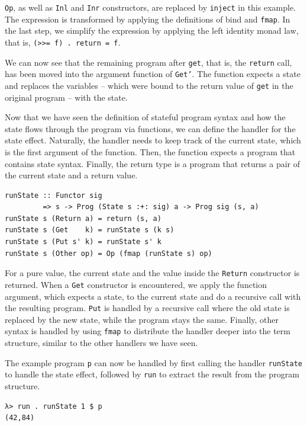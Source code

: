 \documentclass[a4paper, 11pt, fleqn, twoside]{scrreprt}
\newcommand{\hinl}[1]{\texttt{#1}}
\begin{document}
\hinl{Op}, as well as \hinl{Inl} and \hinl{Inr} constructors, are replaced by \hinl{inject} in this example.
The expression is transformed by applying the definitions of bind and \hinl{fmap}.
In the last step, we simplify the expression by applying the left identity monad law, that is, \hinl{(>>= f) . return = f}.

We can now see that the remaining program after \hinl{get}, that is, the \hinl{return} call, has been moved into the argument function of \hinl{Get'}.
The function expects a state and replaces the variables -- which were bound to the return value of \hinl{get} in the original program -- with the state.

Now that we have seen the definition of stateful program syntax and how the state flows through the program via functions, we can define the handler for the state effect.
Naturally, the handler needs to keep track of the current state, which is the first argument of the function.
Then, the function expects a program that contains state syntax.
Finally, the return type is a program that returns a pair of the current state and a return value.

\begin{verbatim}
runState :: Functor sig 
         => s -> Prog (State s :+: sig) a -> Prog sig (s, a)
runState s (Return a) = return (s, a)
runState s (Get    k) = runState s (k s)
runState s (Put s' k) = runState s' k
runState s (Other op) = Op (fmap (runState s) op)
\end{verbatim}

For a pure value, the current state and the value inside the \hinl{Return} constructor is returned.
When a \hinl{Get} constructor is encountered, we apply the function argument, which expects a state, to the current state and do a recursive call with the resulting program.
\hinl{Put} is handled by a recursive call where the old state is replaced by the new state, while the program stays the same.
Finally, other syntax is handled by using \hinl{fmap} to distribute the handler deeper into the term structure, similar to the other handlers we have seen.

The example program \hinl{p} can now be handled by first calling the handler \hinl{runState} to handle the state effect, followed by \hinl{run} to extract the result from the program structure.

\begin{verbatim}
λ> run . runState 1 $ p
(42,84)
\end{verbatim}
\end{document}

